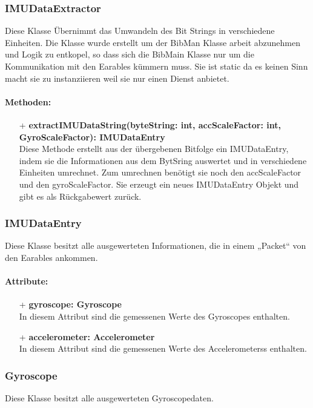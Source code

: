 \documentclass[a4paper,12pt]{article}
\begin{document}
\subsubsection{IMUDataExtractor}
Diese Klasse Übernimmt das Umwandeln des Bit Strings in verschiedene Einheiten.
Die Klasse wurde erstellt um der BibMan Klasse arbeit abzunehmen und Logik zu entkopel, so dass sich die BibMain Klasse nur um die Kommunikation mit den Earables kümmern muss. Sie ist static da es keinen Sinn macht sie zu instanziieren weil sie nur einen Dienst anbietet.

\paragraph{Methoden:}
\begin{itemize}
	\item[+] \textbf{extractIMUDataString(byteString: int, accScaleFactor: int, GyroScaleFactor): IMUDataEntry}\\Diese Methode erstellt aus der übergebenen Bitfolge ein IMUDataEntry, indem sie die Informationen aus dem BytSring auswertet und in verschiedene Einheiten umrechnet. Zum umrechnen benötigt sie noch den accScaleFactor und den gyroScaleFactor. Sie erzeugt ein neues IMUDataEntry Objekt und gibt es als Rückgabewert zurück.
\end{itemize}


\subsubsection{IMUDataEntry}
Diese Klasse besitzt alle ausgewerteten Informationen, die in einem „Packet“ von den Earables ankommen.

\paragraph{Attribute:}
\begin{itemize}
	\item[+] \textbf{gyroscope: Gyroscope}\\In diesem Attribut sind die gemessenen Werte des Gyroscopes enthalten.
	\item[+] \textbf{accelerometer: Accelerometer}\\In diesem Attribut sind die gemessenen Werte des Accelerometerss enthalten.
\end{itemize}


\subsubsection{Gyroscope}
Diese Klasse besitzt alle ausgewerteten Gyroscopedaten.
\end{document}
